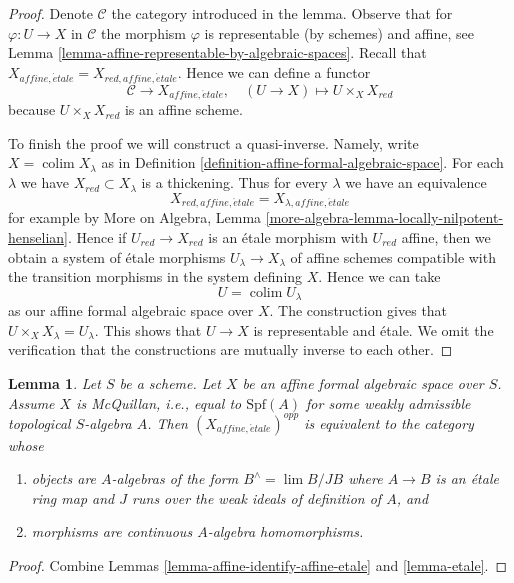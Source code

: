 \documentclass{stacks-project}
\theoremstyle{plain}
\newtheorem{lemma}[subsection]{Lemma}
\theoremstyle{definition}
\theoremstyle{remark}
\numberwithin{equation}{subsection}
\def\lim{\mathop{\mathrm{lim}}\nolimits}
\def\colim{\mathop{\mathrm{colim}}\nolimits}
\def\etale{{\acute{e}tale}}
\begin{document}
\begin{proof}
Denote $\mathcal{C}$ the category introduced in the lemma.
Observe that for $\varphi : U \to X$ in $\mathcal{C}$ the
morphism $\varphi$ is representable (by schemes) and affine, see
Lemma \ref{lemma-affine-representable-by-algebraic-spaces}.
Recall that $X_{affine, \etale} = X_{red, affine, \etale}$.
Hence we can define a functor
$$
\mathcal{C} \longrightarrow X_{affine, \etale},\quad
(U \to X) \longmapsto U \times_X X_{red}
$$
because $U \times_X X_{red}$ is an affine scheme.

\medskip\noindent
To finish the proof we will construct a quasi-inverse.
Namely, write $X = \colim X_\lambda$ as in
Definition \ref{definition-affine-formal-algebraic-space}.
For each $\lambda$ we have $X_{red} \subset X_\lambda$
is a thickening. Thus for every $\lambda$ we have an
equivalence
$$
X_{red, affine, \etale} = X_{\lambda, affine, \etale}
$$
for example by
More on Algebra, Lemma \ref{more-algebra-lemma-locally-nilpotent-henselian}.
Hence if $U_{red} \to X_{red}$ is an \'etale morphism with
$U_{red}$ affine, then we obtain a system of \'etale morphisms
$U_\lambda \to X_\lambda$ of affine schemes compatible with the
transition morphisms in the system defining $X$. Hence we can take
$$
U = \colim U_\lambda
$$
as our affine formal algebraic space over $X$. The construction gives that
$U \times_X X_\lambda = U_\lambda$. This shows that $U \to X$ is
representable and \'etale. We omit the verification that the constructions
are mutually inverse to each other.
\end{proof}

\begin{lemma}
\label{lemma-affine-etale-mcquillan}
Let $S$ be a scheme. Let $X$ be an affine formal
algebraic space over $S$. Assume $X$ is McQuillan, i.e.,
equal to $\text{Spf}(A)$ for some
weakly admissible topological $S$-algebra $A$.
Then $(X_{affine, \etale})^{opp}$ is equivalent to
the category whose
\begin{enumerate}
\item objects are $A$-algebras of the form
$B^\wedge = \lim B/JB$ where $A \to B$ is an \'etale ring map
and $J$ runs over the weak ideals of definition of $A$, and
\item morphisms are continuous $A$-algebra homomorphisms.
\end{enumerate}
\end{lemma}

\begin{proof}
Combine Lemmas \ref{lemma-affine-identify-affine-etale} and \ref{lemma-etale}.
\end{proof}
\end{document}
